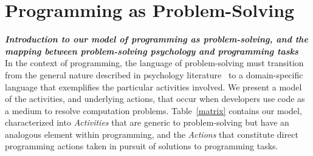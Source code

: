 \documentclass{ppig}
\newcommand{\bold}[1]{\textit{\textbf{\color{aoblue}#1}}}
\begin{document}
\section{Programming as Problem-Solving}
\bold{Introduction to our model of programming as problem-solving, and the mapping between problem-solving psychology and programming tasks\\}
In the context of programming, the language of problem-solving must transition from the general nature described in psychology literature~\cite{mayer1992thinking} to a domain-specific language that exemplifies the particular activities involved.
We present a model of the activities, and underlying actions, that occur when developers use code as a medium to resolve computation problems.
Table~\ref{matrix} contains our model, characterized into \textit{Activities} that are generic to problem-solving but have an analogous element within programming, and the \textit{Actions} that constitute direct programming actions taken in pursuit of solutions to programming tasks.
\end{document}
